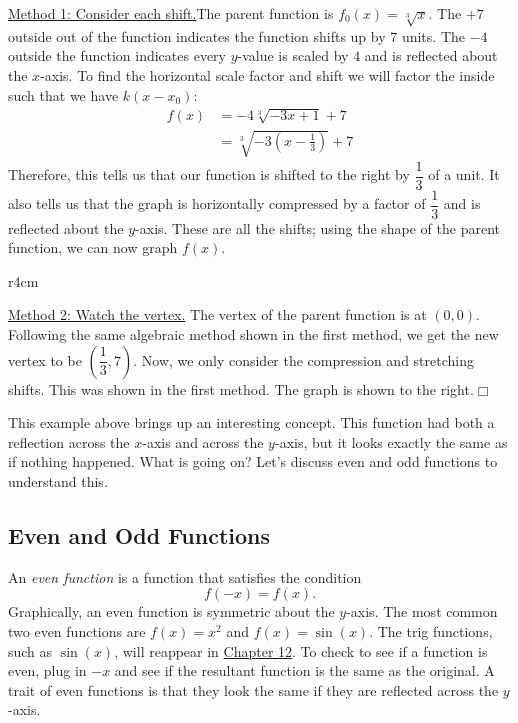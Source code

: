 \documentclass[lang=en,11pt]{elegantbook}
\begin{document}
\begin{solution}
\underline{Method 1: Consider each shift.}\newline The parent function is $f_0(x)=\sqrt[3]{x}$.  The $+7$ outside out of the function indicates the function shifts up by $7$ units.  The $-4$ outside the function indicates every $y$-value is scaled by $4$ and is reflected about the $x$-axis.  To find the horizontal scale factor and shift we will factor the inside such that we have $k(x-x_0)$: \begin{align*}
    f(x)&= -4\sqrt[3]{-3x+1}+7 \\
    &= \sqrt[3]{-3\left(x-\frac{1}{3}\right)}+7
\end{align*}
Therefore, this tells us that our function is shifted to the right by $\dfrac{1}{3}$ of a unit.  It also tells us that the graph is horizontally compressed by a factor of $\dfrac{1}{3}$ and is reflected about the $y$-axis.  These are all the shifts; using the shape of the parent function, we can now graph $f(x)$.  \newline 
\begin{wrapfigure}{r}{4cm}
    \centering
\end{wrapfigure}
\underline{Method 2: Watch the vertex.} \newline The vertex of the parent function is at $(0,0)$.  Following the same algebraic method shown in the first method, we get the new vertex to be $\left(\dfrac{1}{3},7\right)$.  Now, we only consider the compression and stretching shifts.  This was shown in the first method.  \newline
The graph is shown to the right.$\Box$
\end{solution}
This example above brings up an interesting concept.  This function had both a reflection across the $x$-axis and across the $y$-axis, but it looks exactly the same as if nothing happened.  What is going on?  Let's discuss even and odd functions to understand this.
\subsection{Even and Odd Functions}
\noindent An \textit{even function} is a function that satisfies the condition $$f(-x)=f(x).$$  Graphically, an even function is symmetric about the $y$-axis.  The most common two even functions are $f(x)=x^2$ and $f(x)=\sin(x)$.  The trig functions, such as $\sin(x)$, will reappear in \hyperlink{chapter.12}{Chapter 12}.  To check to see if a function is even, plug in $-x$ and see if the resultant function is the same as the original.  A trait of even functions is that they look the same if they are reflected across the $y$-axis.
\end{document}
